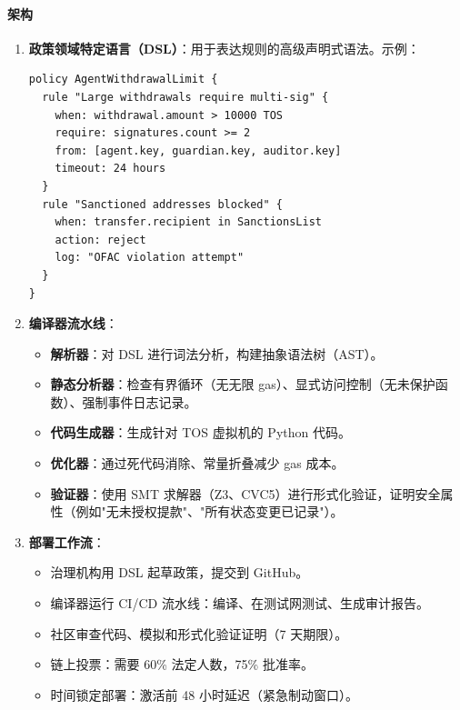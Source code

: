 \documentclass[11pt]{article}
\begin{document}
\paragraph{架构}
\begin{enumerate}[noitemsep]
  \item \textbf{政策领域特定语言（DSL）}：用于表达规则的高级声明式语法。示例：
  \begin{verbatim}
policy AgentWithdrawalLimit {
  rule "Large withdrawals require multi-sig" {
    when: withdrawal.amount > 10000 TOS
    require: signatures.count >= 2
    from: [agent.key, guardian.key, auditor.key]
    timeout: 24 hours
  }
  rule "Sanctioned addresses blocked" {
    when: transfer.recipient in SanctionsList
    action: reject
    log: "OFAC violation attempt"
  }
}
  \end{verbatim}
  \item \textbf{编译器流水线}：
    \begin{itemize}[noitemsep]
      \item \textbf{解析器}：对 DSL 进行词法分析，构建抽象语法树（AST）。
      \item \textbf{静态分析器}：检查有界循环（无无限 gas）、显式访问控制（无未保护函数）、强制事件日志记录。
      \item \textbf{代码生成器}：生成针对 TOS 虚拟机的 Python 代码。
      \item \textbf{优化器}：通过死代码消除、常量折叠减少 gas 成本。
      \item \textbf{验证器}：使用 SMT 求解器（Z3、CVC5）进行形式化验证，证明安全属性（例如"无未授权提款"、"所有状态变更已记录"）。
    \end{itemize}
  \item \textbf{部署工作流}：
    \begin{itemize}[noitemsep]
      \item 治理机构用 DSL 起草政策，提交到 GitHub。
      \item 编译器运行 CI/CD 流水线：编译、在测试网测试、生成审计报告。
      \item 社区审查代码、模拟和形式化验证证明（7 天期限）。
      \item 链上投票：需要 60\% 法定人数，75\% 批准率。
      \item 时间锁定部署：激活前 48 小时延迟（紧急制动窗口）。
    \end{itemize}
\end{enumerate}
\end{document}

